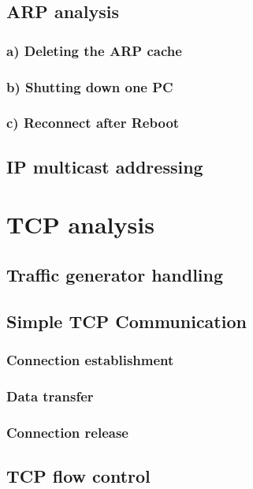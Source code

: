 \section{ARP analysis}
\subsection{a) Deleting the ARP cache}
\subsection{b) Shutting down one PC}
\subsection{c) Reconnect after Reboot}

\section{IP multicast addressing}
\chapter{TCP analysis}
\label{tcp}
\section{Traffic generator handling}

\section{Simple TCP Communication}
\subsection{Connection establishment}
\subsection{Data transfer}
\subsection{Connection release}

\section{TCP flow control}

